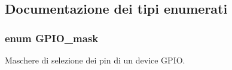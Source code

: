 \subsection{Documentazione dei tipi enumerati}
\hypertarget{group___g_p_i_o___g_r_o_u_p_ga6d5aef8a8a54ee2f602d47252ff66595}{
\subsubsection[{G\+P\+I\+O\+\_\+mask}]{\setlength{\rightskip}{0pt plus 5cm}enum {\bf G\+P\+I\+O\+\_\+mask}}}\label{group___g_p_i_o___g_r_o_u_p_ga6d5aef8a8a54ee2f602d47252ff66595}


Maschere di selezione dei pin di un device G\+P\+I\+O. 

